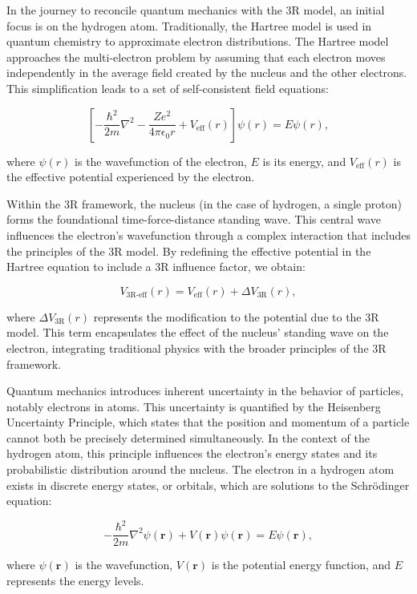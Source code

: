 \documentclass[12pt]{article}
\begin{document}
In the journey to reconcile quantum mechanics with the 3R model, an initial focus is on the hydrogen atom. Traditionally, the Hartree model is used in quantum chemistry to approximate electron distributions. The Hartree model approaches the multi-electron problem by assuming that each electron moves independently in the average field created by the nucleus and the other electrons. This simplification leads to a set of self-consistent field equations:

\[
    \left[ -\frac{\hbar^2}{2m}\nabla^2 - \frac{Ze^2}{4\pi\epsilon_0 r} + V_{\text{eff}}(r) \right] \psi(r) = E\psi(r),
\]

where \(\psi(r)\) is the wavefunction of the electron, \(E\) is its energy, and \(V_{\text{eff}}(r)\) is the effective potential experienced by the electron.

Within the 3R framework, the nucleus (in the case of hydrogen, a single proton) forms the foundational time-force-distance standing wave. This central wave influences the electron's wavefunction through a complex interaction that includes the principles of the 3R model. By redefining the effective potential in the Hartree equation to include a 3R influence factor, we obtain:

\[
    V_{\text{3R-eff}}(r) = V_{\text{eff}}(r) + \Delta V_{\text{3R}}(r),
\]

where \(\Delta V_{\text{3R}}(r)\) represents the modification to the potential due to the 3R model. This term encapsulates the effect of the nucleus' standing wave on the electron, integrating traditional physics with the broader principles of the 3R framework.

Quantum mechanics introduces inherent uncertainty in the behavior of particles, notably electrons in atoms. This uncertainty is quantified by the Heisenberg Uncertainty Principle, which states that the position and momentum of a particle cannot both be precisely determined simultaneously. In the context of the hydrogen atom, this principle influences the electron's energy states and its probabilistic distribution around the nucleus. The electron in a hydrogen atom exists in discrete energy states, or orbitals, which are solutions to the Schrödinger equation:

\[
    -\frac{\hbar^2}{2m}\nabla^2 \psi(\mathbf{r}) + V(\mathbf{r})\psi(\mathbf{r}) = E\psi(\mathbf{r}),
\]

where \(\psi(\mathbf{r})\) is the wavefunction, \(V(\mathbf{r})\) is the potential energy function, and \(E\) represents the energy levels.
\end{document}
